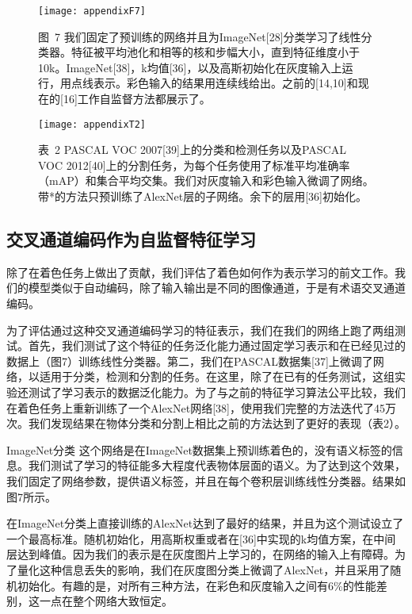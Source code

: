 \begin{figure}[h]
  \centering
  \texttt{[image: appendixF7]}
  \caption*{图~7 我们固定了预训练的网络并且为ImageNet[28]分类学习了线性分类器。特征被平均池化和相等的核和步幅大小，直到特征维度小于10k。ImageNet[38]，k均值[36]，以及高斯初始化在灰度输入上运行，用点线表示。彩色输入的结果用连续线给出。之前的[14,10]和现在的[16]工作自监督方法都展示了。}
  \label{tab:badfigure8}
\end{figure}

\begin{figure}[h]
  \centering
  \texttt{[image: appendixT2]}
  \caption*{表~2 PASCAL VOC 2007[39]上的分类和检测任务以及PASCAL VOC 2012[40]上的分割任务，为每个任务使用了标准平均准确率（mAP）和集合平均交集。我们对灰度输入和彩色输入微调了网络。带*的方法只预训练了AlexNet层的子网络。余下的层用[36]初始化。}
  \label{tab:badfigure9}
\end{figure}

\subsection{交叉通道编码作为自监督特征学习}

除了在着色任务上做出了贡献，我们评估了着色如何作为表示学习的前文工作。我们的模型类似于自动编码，除了输入输出是不同的图像通道，于是有术语交叉通道编码。

为了评估通过这种交叉通道编码学习的特征表示，我们在我们的网络上跑了两组测试。首先，我们测试了这个特征的任务泛化能力通过固定学习表示和在已经见过的数据上（图7）训练线性分类器。第二，我们在PASCAL数据集[37]上微调了网络，以适用于分类，检测和分割的任务。在这里，除了在已有的任务测试，这组实验还测试了学习表示的数据泛化能力。为了与之前的特征学习算法公平比较，我们在着色任务上重新训练了一个AlexNet网络[38]，使用我们完整的方法迭代了45万次。我们发现结果在物体分类和分割上相比之前的方法达到了更好的表现（表2）。

{\heiti ImageNet分类 } 这个网络是在ImageNet数据集上预训练着色的，没有语义标签的信息。我们测试了学习的特征能多大程度代表物体层面的语义。为了达到这个效果，我们固定了网络参数，提供语义标签，并且在每个卷积层训练线性分类器。结果如图7所示。

在ImageNet分类上直接训练的AlexNet达到了最好的结果，并且为这个测试设立了一个最高标准。随机初始化，用高斯权重或者在[36]中实现的k均值方案，在中间层达到峰值。因为我们的表示是在灰度图片上学习的，在网络的输入上有障碍。为了量化这种信息丢失的影响，我们在灰度图分类上微调了AlexNet，并且采用了随机初始化。有趣的是，对所有三种方法，在彩色和灰度输入之间有6\%的性能差别，这一点在整个网络大致恒定。

